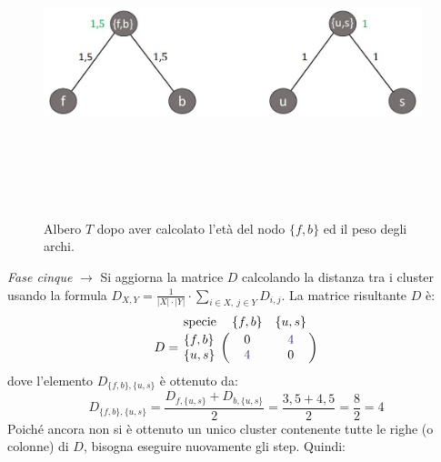 \begin{figure}[h!]
\centering
	\includegraphics[height=9cm, width=11cm,keepaspectratio]{rooted_upgma_6.jpg}
 	\caption{Albero $T$ dopo aver calcolato l'età del nodo $\{f, b\}$ ed il peso degli archi.}
  	\label{fig:rooted_upgma_6}
\end{figure}
\newline
\newline
\textit{Fase cinque} $\rightarrow$ Si aggiorna la matrice $D$ calcolando la distanza tra i cluster usando la formula $D_{X,Y}=\frac{1}{\left | X \right |\cdot \left | Y \right |} \cdot \sum_{i\in X,\: j\in Y}D_{i,j}$. La matrice risultante $D$ è:
\[
D = \bordermatrix{\text{specie}&\{f, b\}&\{u, s\}\cr
                \{f, b\}& 0 & {\color{Blue} 4}\cr
                \{u, s\}& {\color{Blue} 4} & 0}
\]
dove l'elemento $D_{\{f, b\}, \{u, s\}}$ è ottenuto da:
\[D_{\{f, b\}, \{u, s\}}=\frac{D_{f, \{u, s\}}+D_{b, \{u, s\}}}{2}=\frac{3,5+4,5}{2}=\frac{8}{2}=4\]
\newline
Poiché ancora non si è ottenuto un unico cluster contenente tutte le righe (o colonne) di $D$, bisogna eseguire nuovamente gli step. Quindi:
